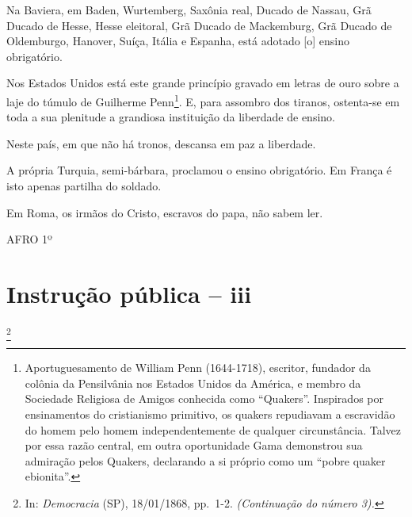 Na Baviera, em Baden, Wurtemberg, Saxônia real, Ducado de Nassau, Grã
Ducado de Hesse, Hesse eleitoral, Grã Ducado de Mackemburg, Grã Ducado
de Oldemburgo, Hanover, Suíça, Itália e Espanha, está adotado {[}o{]}
ensino obrigatório.

Nos Estados Unidos está este grande princípio gravado em letras de ouro
sobre a laje do túmulo de Guilherme Penn\footnote{Aportuguesamento de
  William Penn (1644-1718), escritor, fundador da colônia da Pensilvânia
  nos Estados Unidos da América, e membro da Sociedade Religiosa de
  Amigos conhecida como ``Quakers''. Inspirados por ensinamentos do
  cristianismo primitivo, os quakers repudiavam a escravidão do homem
  pelo homem independentemente de qualquer circunstância. Talvez por
  essa razão central, em outra oportunidade Gama demonstrou sua
  admiração pelos Quakers, declarando a si próprio como um ``pobre quaker
  ebionita''.}. E, para assombro dos tiranos, ostenta-se em toda a sua
plenitude a grandiosa instituição da liberdade de ensino.

Neste país, em que não há tronos, descansa em paz a liberdade.

A própria Turquia, semi-bárbara, proclamou o ensino obrigatório. Em
França é isto apenas partilha do soldado.

Em Roma, os irmãos do Cristo, escravos do papa, não sabem ler.

AFRO 1º

\chapter{Instrução pública -- iii}\footnote{In: \emph{Democracia} (SP),
  18/01/1868, pp.~1-2. \emph{(Continuação do número 3).}}


